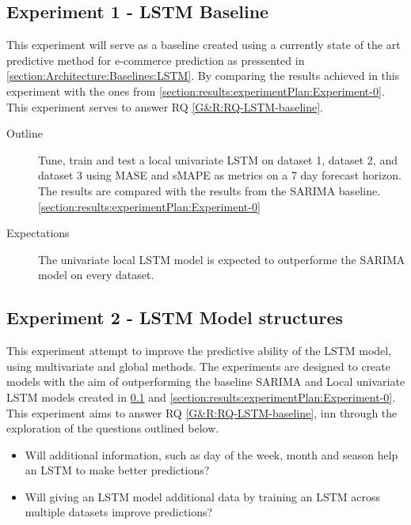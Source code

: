 \subsection{Experiment 1 - LSTM Baseline}
\label{section:results:experimentPlan:Experiment-1}
This experiment will serve as a baseline created using a currently state of the art predictive method
for e-commerce prediction as pressented in \cref{section:Architecture:Baselines:LSTM}.
By comparing the results achieved in this experiment with the ones from \cref{section:results:experimentPlan:Experiment-0}.
This experiment serves to answer RQ \cref{G&R:RQ-LSTM-baseline}.

\begin{description}
  \item[Outline]{
              Tune, train and test a local univariate LSTM on dataset 1,
              dataset 2, and dataset 3 using MASE and sMAPE as metrics on a 7 day forecast horizon.
              The results are compared with the results from the SARIMA baseline. \cref{section:results:experimentPlan:Experiment-0}}
\end{description}

\begin{description}
  \item[Expectations]{
              The univariate local LSTM model is expected to outperforme the SARIMA model on every dataset.
        }
\end{description}




\subsection{Experiment 2 - LSTM Model structures}
\label{section:results:experimentPlan:Experiment-2}
This experiment attempt to improve the predictive ability of the LSTM model,
using multivariate and global methods.
The experiments are designed to create models with the aim of outperforming the baseline
SARIMA and Local univariate LSTM models created in \cref{section:results:experimentPlan:Experiment-1} and \cref{section:results:experimentPlan:Experiment-0}.
This experiment aims to answer RQ \cref{G&R:RQ-LSTM-baseline},
inn through the exploration of the questions outlined below.

\begin{itemize}
  \item {Will additional information, such as day of the week, month and season help an LSTM to make better predictions?}
  \item {Will giving an LSTM model additional data by training an LSTM across multiple datasets improve predictions?}
\end{itemize}

